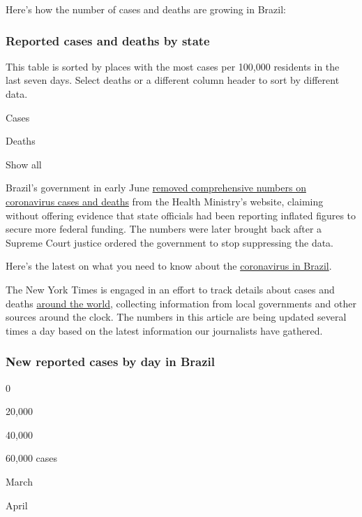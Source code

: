 Here's how the number of cases and deaths are growing in Brazil:

\hypertarget{reported-cases-and-deaths-by-state}{%
\subsubsection{Reported cases and deaths by
state}\label{reported-cases-and-deaths-by-state}}

This table is sorted by places with the most cases per 100,000 residents
in the last seven days. Select deaths or a different column header to
sort by different data.

Cases

Deaths

Show all

Brazil's government in early June
\href{https://www.nytimes3xbfgragh.onion/2020/06/06/world/coronavirus-update-us-usa.html\#link-3cfab740}{removed
comprehensive numbers on coronavirus cases and deaths} from the Health
Ministry's website, claiming without offering evidence that state
officials had been reporting inflated figures to secure more federal
funding. The numbers were later brought back after a Supreme Court
justice ordered the government to stop suppressing the data.

Here's the latest on what you need to know about the
\href{https://www.nytimes3xbfgragh.onion/article/brazil-coronavirus-cases.html}{coronavirus
in Brazil}.

The New York Times is engaged in an effort to track details about cases
and deaths
\href{https://www.nytimes3xbfgragh.onion/interactive/2020/world/coronavirus-maps.html}{around
the world}, collecting information from local governments and other
sources around the clock. The numbers in this article are being updated
several times a day based on the latest information our journalists have
gathered.

\hypertarget{new-reported-cases-by-day-in-brazil}{%
\subsubsection{New reported cases by day in
Brazil}\label{new-reported-cases-by-day-in-brazil}}

0

20,000

40,000

60,000 cases

March

April

